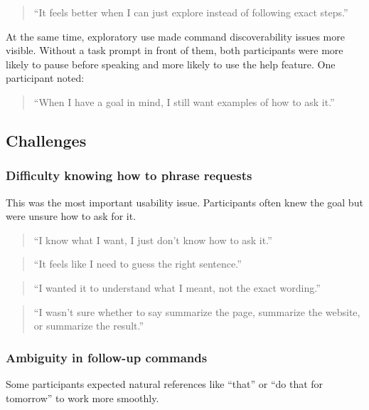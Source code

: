 \documentclass[12pt, titlepage]{article}
\begin{document}
\begin{quote}
``It feels better when I can just explore instead of following exact
steps.''
\end{quote}

At the same time, exploratory use made command discoverability issues
more visible. Without a task prompt in front of them, both participants
were more likely to pause before speaking and more likely to use the
help feature. One participant noted:

\begin{quote}
``When I have a goal in mind, I still want examples of how to ask it.''
\end{quote}

\subsection{Challenges}

\subsubsection{Difficulty knowing how to phrase requests}

This was the most important usability issue. Participants often knew the
goal but were unsure how to ask for it.

\begin{quote}
``I know what I want, I just don't know how to ask it.''
\end{quote}

\begin{quote}
``It feels like I need to guess the right sentence.''
\end{quote}

\begin{quote}
``I wanted it to understand what I meant, not the exact wording.''
\end{quote}

\begin{quote}
``I wasn't sure whether to say summarize the page, summarize the
website, or summarize the result.''
\end{quote}

\subsubsection{Ambiguity in follow-up commands}

Some participants expected natural references like ``that'' or ``do that
for tomorrow'' to work more smoothly.
\end{document}
